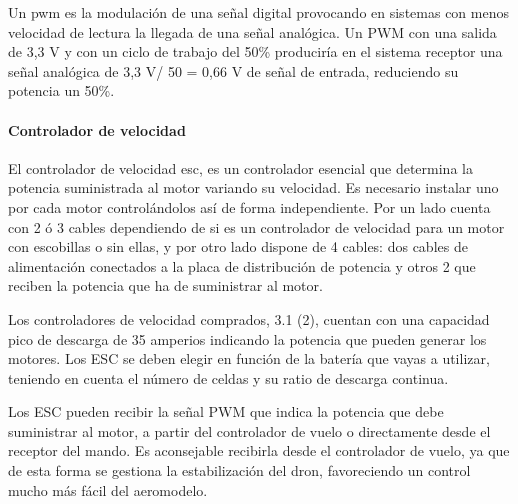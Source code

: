  
 Un \acl{pwm} es la modulación de una señal digital provocando en sistemas con menos velocidad de lectura la llegada de una señal analógica. Un PWM con una salida de 3,3 V y con un ciclo de trabajo del 50\% produciría en el sistema receptor una señal analógica de 3,3 V/ 50 = 0,66 V de señal de entrada, reduciendo su potencia un 50\%.

 
 \paragraph{Controlador de velocidad}
 \label{SSS:Controlador de velocidad}
 


 El controlador de velocidad \acl{esc}, es un controlador esencial que determina la potencia suministrada al motor variando su velocidad. Es necesario instalar uno por cada motor controlándolos así de forma independiente.
 Por un lado cuenta con 2 ó 3 cables dependiendo de si es un controlador de velocidad para un motor con escobillas o sin ellas, y por otro lado dispone de 4 cables: dos cables de alimentación conectados a la placa de distribución de potencia y otros 2 que reciben la potencia que ha de suministrar al motor.
 
 
 Los controladores de velocidad comprados, 3.1 (2), cuentan con una capacidad pico de descarga de 35 amperios indicando la potencia que pueden generar los motores. Los ESC se deben elegir en función de la batería que vayas a utilizar, teniendo en cuenta el número de celdas y su ratio de descarga continua.
 
 Los ESC pueden recibir la señal PWM que indica la potencia que debe suministrar al motor, a partir del controlador de vuelo o directamente desde el receptor del mando. Es aconsejable recibirla desde el controlador de vuelo, ya que de esta forma se gestiona la estabilización del dron, favoreciendo un control mucho más fácil del aeromodelo\cite{OscarSerrano}. 

